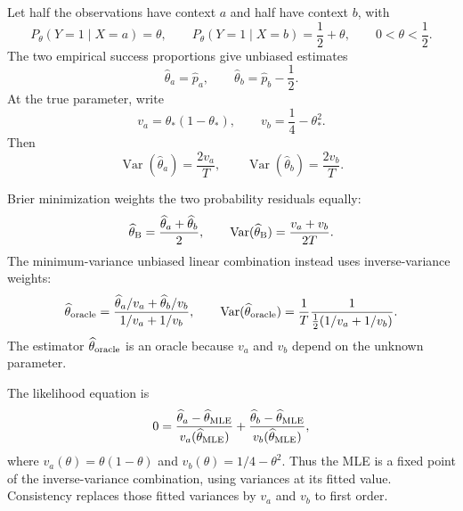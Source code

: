 \documentclass[11pt,twoside]{article}
\theoremstyle{definition}
\theoremstyle{remark}
\begin{document}
Let half the observations have context $a$ and half have context $b$, with
\begin{equation}
P_\theta(Y=1\mid X=a)=\theta,
\qquad
P_\theta(Y=1\mid X=b)=\frac12+\theta,
\qquad 0<\theta<\frac12.
\label{eq:two-context-model}
\end{equation}
The two empirical success proportions give unbiased estimates
\begin{equation}
\widehat\theta_a=\widehat p_a,
\qquad
\widehat\theta_b=\widehat p_b-\frac12.
\label{eq:two-group-estimates}
\end{equation}
At the true parameter, write
\begin{equation}
v_a=\theta_*(1-\theta_*),
\qquad
v_b=\frac14-\theta_*^2.
\label{eq:two-group-variances}
\end{equation}
Then
\begin{equation}
\operatorname{Var}(\widehat\theta_a)=\frac{2v_a}{T},
\qquad
\operatorname{Var}(\widehat\theta_b)=\frac{2v_b}{T}.
\label{eq:two-group-estimator-variances}
\end{equation}

Brier minimization weights the two probability residuals equally:
\begin{equation}
\widehat\theta_{\rm B}
=\frac{\widehat\theta_a+\widehat\theta_b}{2},
\qquad
\operatorname{Var}(\widehat\theta_{\rm B})
=\frac{v_a+v_b}{2T}.
\label{eq:brier-estimator}
\end{equation}
The minimum-variance unbiased linear combination instead uses inverse-variance
weights:
\begin{equation}
\widehat\theta_{\rm oracle}
=\frac{\widehat\theta_a/v_a+\widehat\theta_b/v_b}
{1/v_a+1/v_b},
\qquad
\operatorname{Var}(\widehat\theta_{\rm oracle})
=\frac1T\frac{1}{\tfrac12(1/v_a+1/v_b)}.
\label{eq:oracle-estimator}
\end{equation}
The estimator $\widehat\theta_{\rm oracle}$ is an oracle because $v_a$ and
$v_b$ depend on the unknown parameter.

The likelihood equation is
\begin{equation}
0=
\frac{\widehat\theta_a-\widehat\theta_{\rm MLE}}
{v_a(\widehat\theta_{\rm MLE})}
+\frac{\widehat\theta_b-\widehat\theta_{\rm MLE}}
{v_b(\widehat\theta_{\rm MLE})},
\label{eq:mle-fixed-point}
\end{equation}
where $v_a(\theta)=\theta(1-\theta)$ and
$v_b(\theta)=1/4-\theta^2$. Thus the MLE is a fixed point of the
inverse-variance combination, using variances at its fitted value. Consistency
replaces those fitted variances by $v_a$ and $v_b$ to first order.
\end{document}

